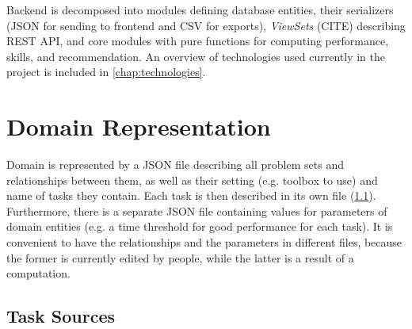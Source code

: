 
Backend is decomposed into modules defining database entities,
their serializers (JSON for sending to frontend and CSV for exports),
\emph{ViewSets} (CITE) describing REST API,
and core modules with pure functions
for computing performance, skills, and recommendation.
An overview of technologies used currently in the project
is included in \cref{chap:technologies}.

\section{Domain Representation}

Domain is represented by a JSON file describing all problem sets %
and relationships between them, as well as their setting (e.g. toolbox to use)
and name of tasks they contain.
Each task is then described in its own file (\cref{sec:impl.task-sources}).
Furthermore, there is a separate JSON file containing values for parameters
of domain entities (e.g. a time threshold for good performance for each task).
It is convenient to have the relationships and the parameters in different files,
because the former is currently edited by people, while the latter is
a result of a computation.

\subsection{Task Sources}
\label{sec:impl.task-sources}

